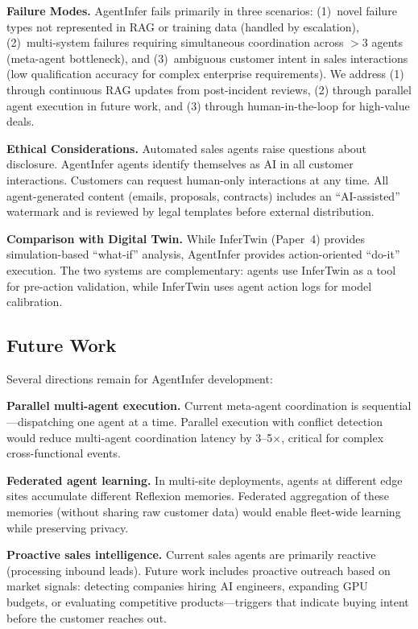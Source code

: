 \documentclass[conference,10pt,letterpaper]{IEEEtran}
\begin{document}
\textbf{Failure Modes.} AgentInfer fails primarily in three scenarios: (1)~novel failure types not represented in RAG or training data (handled by escalation), (2)~multi-system failures requiring simultaneous coordination across $>$3 agents (meta-agent bottleneck), and (3)~ambiguous customer intent in sales interactions (low qualification accuracy for complex enterprise requirements). We address (1) through continuous RAG updates from post-incident reviews, (2) through parallel agent execution in future work, and (3) through human-in-the-loop for high-value deals.

\textbf{Ethical Considerations.} Automated sales agents raise questions about disclosure. AgentInfer agents identify themselves as AI in all customer interactions. Customers can request human-only interactions at any time. All agent-generated content (emails, proposals, contracts) includes an ``AI-assisted'' watermark and is reviewed by legal templates before external distribution.

\textbf{Comparison with Digital Twin.} While InferTwin (Paper~4) provides simulation-based ``what-if'' analysis, AgentInfer provides action-oriented ``do-it'' execution. The two systems are complementary: agents use InferTwin as a tool for pre-action validation, while InferTwin uses agent action logs for model calibration.


\subsection{Future Work}

Several directions remain for AgentInfer development:

\textbf{Parallel multi-agent execution.} Current meta-agent coordination is sequential---dispatching one agent at a time. Parallel execution with conflict detection would reduce multi-agent coordination latency by 3--5$\times$, critical for complex cross-functional events.

\textbf{Federated agent learning.} In multi-site deployments, agents at different edge sites accumulate different Reflexion memories. Federated aggregation of these memories (without sharing raw customer data) would enable fleet-wide learning while preserving privacy.

\textbf{Proactive sales intelligence.} Current sales agents are primarily reactive (processing inbound leads). Future work includes proactive outreach based on market signals: detecting companies hiring AI engineers, expanding GPU budgets, or evaluating competitive products---triggers that indicate buying intent before the customer reaches out.
\end{document}
